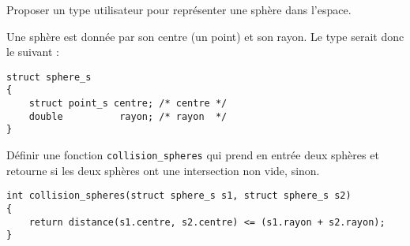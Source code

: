 \begin{lastenu}
\item Proposer un type utilisateur pour représenter une sphère dans
  l'espace.
  \begin{correction}
Une sphère est donnée par son centre (un point) et son rayon. Le type serait donc le suivant :
\begin{verbatim}
struct sphere_s
{
    struct point_s centre; /* centre */
    double          rayon; /* rayon  */
}
\end{verbatim}
\end{correction}
\item Définir une fonction \verb+collision_spheres+ qui prend en
  entrée deux sphères et retourne  si les deux sphères ont une
  intersection non vide,  sinon.
  \begin{correction}
\begin{verbatim}
int collision_spheres(struct sphere_s s1, struct sphere_s s2)
{
    return distance(s1.centre, s2.centre) <= (s1.rayon + s2.rayon);
}
\end{verbatim}
\end{correction}
\end{lastenu}


